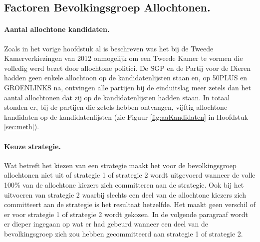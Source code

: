 \subsection{Factoren Bevolkingsgroep Allochtonen.}

\paragraph{Aantal allochtone kandidaten.} 
Zoals in het vorige hoofdstuk al is beschreven was het bij de Tweede Kamerverkiezingen van 2012 onmogelijk om een Tweede Kamer te vormen die volledig werd bezet door allochtone politici. De SGP en de Partij voor de Dieren hadden geen enkele allochtoon op de kandidatenlijsten staan en, op 50PLUS en GROENLINKS na, ontvingen alle partijen bij de einduitslag meer zetels dan het aantal allochtonen dat zij op de kandidatenlijsten hadden staan. In totaal stonden er, bij de partijen die zetels hebben ontvangen, vijftig allochtone kandidaten op de kandidatenlijsten (zie Figuur \ref{fig:aaKandidaten} in Hoofdstuk \ref{sec:meth}). 

\paragraph{Keuze strategie.}
Wat betreft het kiezen van een strategie maakt het voor de bevolkingsgroep allochtonen niet uit of strategie 1 of strategie 2 wordt uitgevoerd wanneer de volle 100\% van de allochtone kiezers zich committeren aan de strategie. Ook bij het uitvoeren van strategie 2 waarbij slechts een deel van de allochtone kiezers zich committeert aan de strategie is het resultaat hetzelfde. Het maakt geen verschil of er voor strategie 1 of strategie 2 wordt gekozen. In de volgende paragraaf wordt er dieper ingegaan op wat er had gebeurd wanneer een deel van de bevolkingsgroep zich zou hebben gecommitteerd aan strategie 1 of strategie 2.




